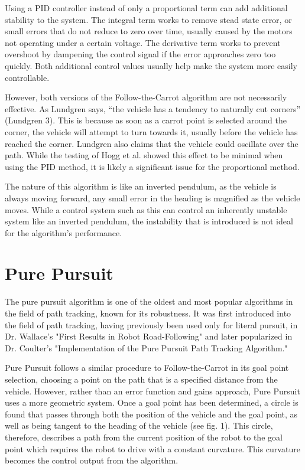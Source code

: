 \documentclass[mla7]{mla}
\begin{document}
\begin{paper}
Using a PID controller instead of only a proportional term can add additional stability to the system. The integral term works to remove stead state error, or small errors that do not reduce to zero over time, usually caused by the motors not operating under a certain voltage. The derivative term works to prevent overshoot by dampening the control signal if the error approaches zero too quickly. Both additional control values usually help make the system more easily controllable.

However, both versions of the Follow-the-Carrot algorithm are not necessarily effective. As Lundgren says, ``the vehicle has a tendency to naturally cut corners'' (Lundgren 3). This is because as soon as a carrot point is selected around the corner, the vehicle will attempt to turn towards it, usually before the vehicle has reached the corner. Lundgren also claims that the vehicle could oscillate over the path. While the testing of Hogg et al. showed this effect to be minimal when using the PID method, it is likely a significant issue for the proportional method.

The nature of this algorithm is like an inverted pendulum, as the vehicle is always moving forward, any small error in the heading is magnified as the vehicle moves. While a control system such as this can control an inherently unstable system like an inverted pendulum, the instability that is introduced is not ideal for the algorithm's performance.

\section{Pure Pursuit}

The pure pursuit algorithm is one of the oldest and most popular algorithms in the field of path tracking, known for its robustness. It was first introduced into the field of path tracking, having previously been used only for literal pursuit, in Dr. Wallace's "First Results in Robot Road-Following" and later popularized in Dr. Coulter's "Implementation of the Pure Pursuit Path Tracking Algorithm."

Pure Pursuit follows a similar procedure to Follow-the-Carrot in its goal point selection, choosing a point on the path that is a specified distance from the vehicle. However, rather than an error function and gains approach, Pure Pursuit uses a more geometric system. Once a goal point has been determined, a circle is found that passes through both the position of the vehicle and the goal point, as well as being tangent to the heading of the vehicle (see fig. 1). This circle, therefore, describes a path from the current position of the robot to the goal point which requires the robot to drive with a constant curvature. This curvature becomes the control output from the algorithm.


\end{paper}
\end{document}
